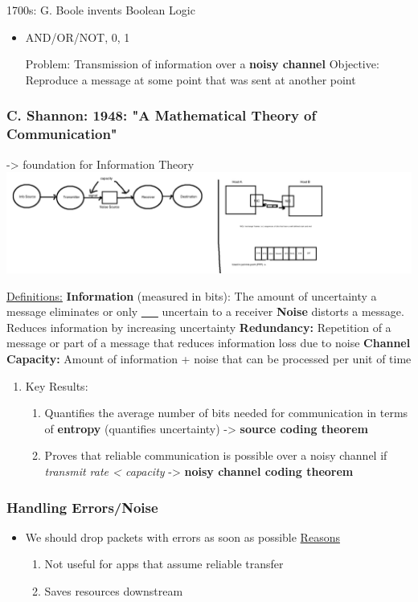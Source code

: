 \documentclass[11pt]{article}
\begin{document}
1700s: G. Boole invents Boolean Logic
\begin{itemize}
\item AND/OR/NOT, 0, 1

Problem: Transmission of information over a \textbf{noisy channel}
Objective: Reproduce a message at some point that was sent at another point
\end{itemize}

\subsubsection{C. Shannon: 1948: "A Mathematical Theory of Communication"}
\label{sec:orgheadline23}
-> foundation for Information Theory
\includegraphics[width=.9\linewidth]{diagrams/fig5.png}

\uline{Definitions:}
\textbf{Information} (measured in bits): The amount of uncertainty a message
eliminates or only \uline{\_\_} uncertain to a receiver
\textbf{Noise} distorts a message. Reduces information by increasing uncertainty
\textbf{Redundancy:} Repetition of a message or part of a message that reduces information loss due to noise
\textbf{Channel Capacity:} Amount of information + noise that can be processed per
unit of time

\begin{enumerate}
\item Key Results:
\label{sec:orgheadline22}
\begin{enumerate}
\item Quantifies the average number of bits needed for communication in terms
of \textbf{entropy} (quantifies uncertainty) -> \textbf{source coding theorem}
\item Proves that reliable communication is possible over a noisy channel if
\emph{transmit rate < capacity} -> \textbf{noisy channel coding theorem}
\end{enumerate}
\end{enumerate}

\subsubsection{Handling Errors/Noise}
\label{sec:orgheadline25}
\begin{itemize}
\item We should drop packets with errors as soon as possible
\uline{Reasons}
\begin{enumerate}
\item Not useful for apps that assume reliable transfer
\item Saves resources downstream
\end{enumerate}
\end{itemize}
\end{document}
